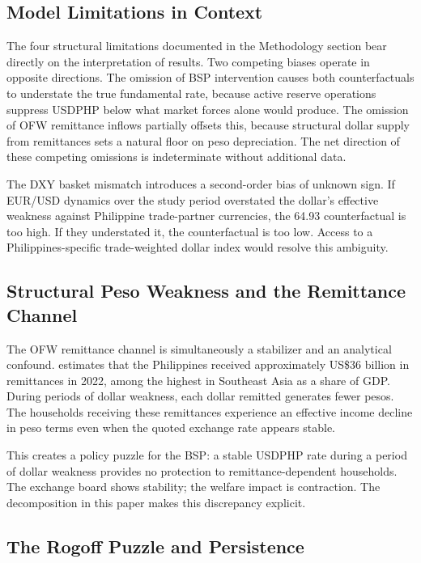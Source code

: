 \documentclass[12pt]{article}
\begin{document}
\subsection{Model Limitations in Context}

The four structural limitations documented in the Methodology section bear directly
on the interpretation of results. Two competing biases operate in opposite directions.
The omission of BSP intervention causes both counterfactuals to understate the true
fundamental rate, because active reserve operations suppress USDPHP below what market
forces alone would produce. The omission of OFW remittance inflows partially offsets
this, because structural dollar supply from remittances sets a natural floor on peso
depreciation. The net direction of these competing omissions is indeterminate without
additional data.

The DXY basket mismatch introduces a second-order bias of unknown sign. If EUR/USD
dynamics over the study period overstated the dollar's effective weakness against
Philippine trade-partner currencies, the 64.93 counterfactual is too high. If they
understated it, the counterfactual is too low. Access to a Philippines-specific
trade-weighted dollar index would resolve this ambiguity.

\subsection{Structural Peso Weakness and the Remittance Channel}

The OFW remittance channel is simultaneously a stabilizer and an analytical
confound. \citet{worldbank2023} estimates that the Philippines received approximately
US\$36 billion in remittances in 2022, among the highest in Southeast Asia as a share
of GDP. During periods of dollar weakness, each dollar remitted generates fewer pesos.
The households receiving these remittances experience an effective income decline in
peso terms even when the quoted exchange rate appears stable.

This creates a policy puzzle for the BSP: a stable USDPHP rate during a period of
dollar weakness provides no protection to remittance-dependent households. The
exchange board shows stability; the welfare impact is contraction. The decomposition
in this paper makes this discrepancy explicit.

\subsection{The Rogoff Puzzle and Persistence}
\end{document}
